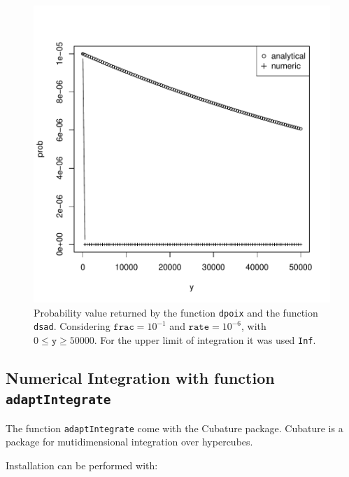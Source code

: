 \documentclass{article}
\newcommand{\code}[1]{\texttt{#1}}
\begin{document}
\begin{figure}[ht]
  \begin{center}
\includegraphics{sads_logbook-018}
\end{center}
\caption{Probability value returned by the function \code{dpoix} and the function \code{dsad}. Considering $\code{frac}=10^{-1}$ and $\code{rate}=10^{-6}$, with $0 \leq \code{y} \geq 50000$. For the upper limit of integration it was used \code{Inf}.}
\label{fig:distrExIntegrate}
\end{figure}


\subsection*{Numerical Integration with function \code{adaptIntegrate}}

The function \code{adaptIntegrate} come with the Cubature package. Cubature is a package for mutidimensional integration over hypercubes.

Installation can be performed with:
\end{document}
